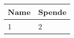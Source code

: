 \documentclass{scrartcl}
\begin{document}
\begin{tabular}{ll} \toprule 
Name & Spende \\ \midrule
1 &2\\
\bottomrule
 \end{tabular}
 
\end{document}
